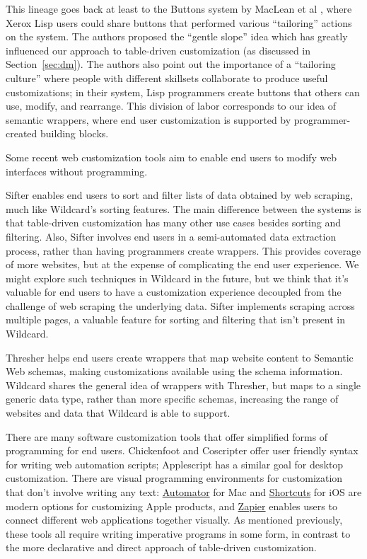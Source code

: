 \documentclass[sigplan,10pt,anonymous,review]{acmart}
\begin{document}
This lineage goes back at least to the Buttons system by MacLean et al
\citep{maclean1990}, where Xerox Lisp users could share buttons that
performed various ``tailoring'' actions on the system. The authors
proposed the ``gentle slope'' idea which has greatly influenced our
approach to table-driven customization (as discussed in
Section~\ref{sec:dm}). The authors also point out the importance of a
``tailoring culture'' where people with different skillsets collaborate
to produce useful customizations; in their system, Lisp programmers
create buttons that others can use, modify, and rearrange. This division
of labor corresponds to our idea of semantic wrappers, where end user
customization is supported by programmer-created building blocks.

Some recent web customization tools aim to enable end users to modify
web interfaces without programming.

Sifter \citep{huynh2006} enables end users to sort and filter lists of
data obtained by web scraping, much like Wildcard's sorting features.
The main difference between the systems is that table-driven
customization has many other use cases besides sorting and filtering.
Also, Sifter involves end users in a semi-automated data extraction
process, rather than having programmers create wrappers. This provides
coverage of more websites, but at the expense of complicating the end
user experience. We might explore such techniques in Wildcard in the
future, but we think that it's valuable for end users to have a
customization experience decoupled from the challenge of web scraping
the underlying data. Sifter implements scraping across multiple pages, a
valuable feature for sorting and filtering that isn't present in
Wildcard.

Thresher \citep{hogue2005} helps end users create wrappers that map
website content to Semantic Web schemas, making customizations available
using the schema information. Wildcard shares the general idea of
wrappers with Thresher, but maps to a single generic data type, rather
than more specific schemas, increasing the range of websites and data
that Wildcard is able to support.

There are many software customization tools that offer simplified forms
of programming for end users. Chickenfoot \citep{bolin2005} and
Coscripter \citep{leshed2008} offer user friendly syntax for writing web
automation scripts; Applescript \citep{cook2007} has a similar goal for
desktop customization. There are visual programming environments for
customization that don't involve writing any text:
\href{https://support.apple.com/guide/automator/welcome/mac}{Automator}
for Mac and
\href{https://apps.apple.com/us/app/shortcuts/id915249334}{Shortcuts}
for iOS are modern options for customizing Apple products, and
\href{https://zapier.com/}{Zapier} enables users to connect different
web applications together visually. As mentioned previously, these tools
all require writing imperative programs in some form, in contrast to the
more declarative and direct approach of table-driven customization.
\end{document}
